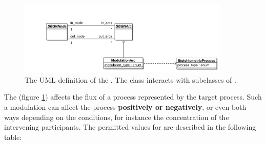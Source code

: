 



\label{defn:ModulationArc}

\begin{figure}[htb]
  \centering
  \includegraphics[width = 0.9\textwidth]{images/modulationarcuml}
  \caption{The UML definition of the . The class interacts with
    subclasses of .}
  \label{fig:techref:modulationarcuml}
\end{figure}

The  (figure \ref{fig:techref:modulationarcuml})
affects the flux of a process represented by the target process. Such
a modulation can affect the process \textbf{positively or negatively},
or even both ways depending on the conditions, for instance the
concentration of the intervening participants. The permitted values
for  are described in the following table:

